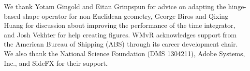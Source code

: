 \documentclass[timestamp,acmtog]{acmart}
\begin{document}
\begin{acks}
We thank Yotam Gingold and Eitan Grinpspun for advice on adapting the hinge-based shape operator for non-Euclidean geometry, George Biros and Qixing Huang for discussion about improving the performance of the time integrator, and Josh Vekhter for help creating figures.
WMvR acknowledges support from the American Bureau of Shipping (ABS) through its career development chair. We also thank the National Science Foundation (DMS 1304211), Adobe Systems, Inc., and SideFX for their support.
\end{acks}



\end{document}

